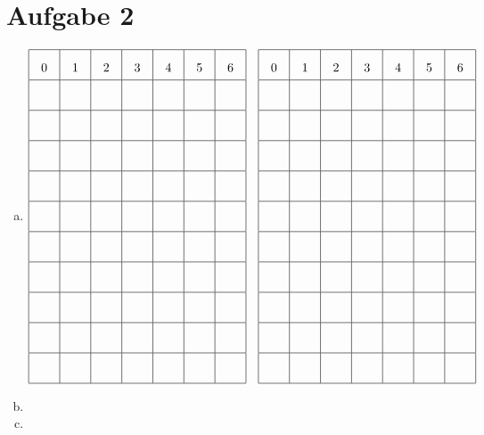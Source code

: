 \documentclass[a4paper,12pt]{scrartcl}
\begin{document}
\section*{Aufgabe 2}
\begin{enumerate}[a)]
	\item
    $$   
        \def\h#1{\parbox{1.5em}{\centering #1}}
        \renewcommand{\arraystretch}{2}
        \begin{array}{|c|*{6}{c|}}\hline
            \h0 & \h1 & \h2 & \h3 & \h4 & \h5 & \h6\\ \hline
            & & & & & & \\ \hline
            & & & & & & \\ \hline
            & & & & & & \\ \hline
            & & & & & & \\ \hline
            & & & & & & \\ \hline
            & & & & & & \\ \hline
            & & & & & & \\ \hline
            & & & & & & \\ \hline
            & & & & & & \\ \hline
            & & & & & & \\ \hline
        \end{array}
        \quad
        \begin{array}{|c|*{6}{c|}}\hline
            \h0 & \h1 & \h2 & \h3 & \h4 & \h5 & \h6\\ \hline
            & & & & & & \\ \hline
            & & & & & & \\ \hline
            & & & & & & \\ \hline
            & & & & & & \\ \hline
            & & & & & & \\ \hline
            & & & & & & \\ \hline
            & & & & & & \\ \hline
            & & & & & & \\ \hline
            & & & & & & \\ \hline
            & & & & & & \\ \hline
        \end{array}
    $$
	\item
	\item
\end{enumerate}
\end{document}
